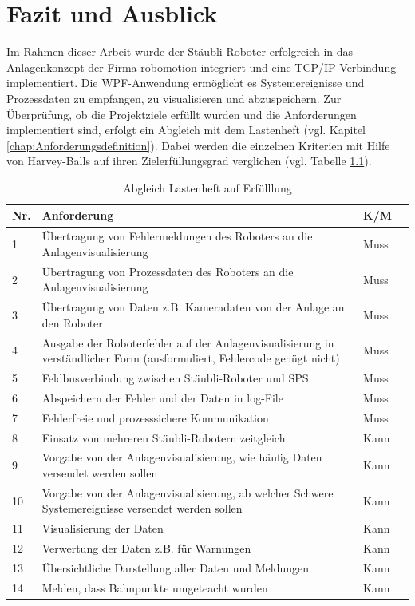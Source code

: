 \documentclass[ a4paper,
                oneside,
                toc=bibliography,
                toc=listof
                ]{scrbook}
\begin{document}
   	\chapter{Fazit und Ausblick}
   	Im Rahmen dieser Arbeit wurde der Stäubli-Roboter erfolgreich in das Anlagenkonzept der Firma \glqq robomotion \grqq{} integriert und eine TCP/IP-Verbindung implementiert. Die WPF-Anwendung ermöglicht es Systemereignisse und Prozessdaten zu empfangen, zu visualisieren und abzuspeichern. Zur Überprüfung, ob die Projektziele erfüllt wurden und die Anforderungen implementiert sind, erfolgt ein Abgleich mit dem Lastenheft (vgl. Kapitel \ref{chap:Anforderungsdefinition}). Dabei werden die einzelnen Kriterien mit Hilfe von Harvey-Balls auf ihren Zielerfüllungsgrad verglichen (vgl. Tabelle \ref{table:LastenheftAbgleich}).
   	\begin{longtable}{|p{0.3cm}|p{11cm}|p{1cm}|p{0.5cm}|}
   		\caption{Abgleich Lastenheft auf Erfülllung}
   		\label{table:LastenheftAbgleich}\\
   		\hline
   		Nr. & Anforderung & K/M & \\ [0.5ex] 
   		\hline
   		\endhead
   		1 & Übertragung von Fehlermeldungen des Roboters an die Anlagenvisualisierung & Muss & \harveyBallFull  \\ 
   		2 & Übertragung von Prozessdaten des Roboters an die Anlagenvisualisierung & Muss & \harveyBallFull \\
   		3 & Übertragung von Daten z.B. Kameradaten von der Anlage an den Roboter & Muss & \harveyBallFull \\
   		4 & Ausgabe der Roboterfehler auf der Anlagenvisualisierung in verständlicher Form (ausformuliert, Fehlercode genügt nicht) & Muss& \harveyBallFull  \\
   		5 & Feldbusverbindung zwischen Stäubli-Roboter und SPS & Muss& \harveyBallFull  \\
   		6 & Abspeichern der Fehler und der Daten in log-File & Muss& \harveyBallFull \\ 
   		7 & Fehlerfreie und prozesssichere Kommunikation & Muss& \harveyBallFull  \\ 
   		8 & Einsatz von mehreren Stäubli-Robotern zeitgleich  & Kann& \harveyBallFull  \\
   		9 & Vorgabe von der Anlagenvisualisierung, wie häufig Daten versendet werden sollen & Kann& \harveyBallFull  \\
   		10 & Vorgabe von der Anlagenvisualisierung, ab welcher Schwere Systemereignisse versendet werden sollen & Kann& \harveyBallFull  \\ 
   		11 & Visualisierung der Daten & Kann& \harveyBallFull  \\
   		12 & Verwertung der Daten z.B. für Warnungen & Kann & \harveyBallFull \\  
   		13 & Übersichtliche Darstellung aller Daten und Meldungen & Kann& \harveyBallHalf \\ 
   		14 & Melden, dass Bahnpunkte umgeteacht wurden & Kann & \harveyBallFull \\ 
   		\hline
   	\end{longtable}
\end{document}

